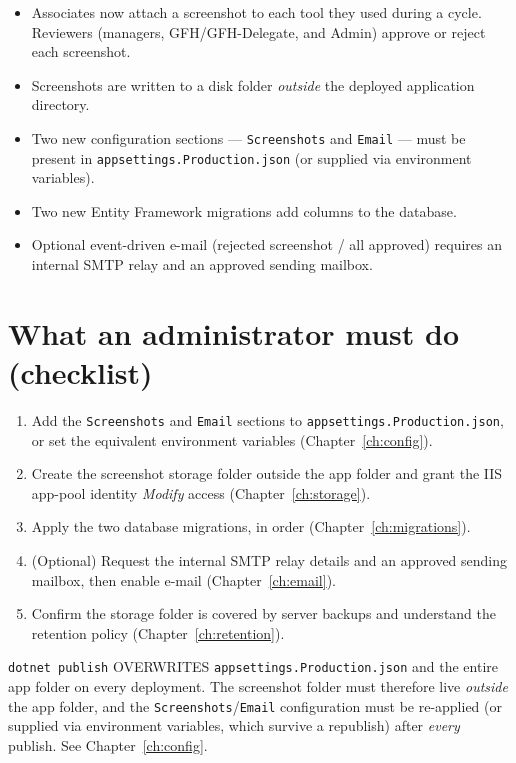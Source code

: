 \documentclass[12pt,a4paper]{report}
\begin{document}
\begin{itemize}
  \item Associates now attach a screenshot to each tool they used during a cycle. Reviewers
        (managers, GFH/GFH-Delegate, and Admin) approve or reject each screenshot.
  \item Screenshots are written to a disk folder \emph{outside} the deployed application directory.
  \item Two new configuration sections --- \texttt{Screenshots} and \texttt{Email} --- must be
        present in \texttt{appsettings.Production.json} (or supplied via environment variables).
  \item Two new Entity Framework migrations add columns to the database.
  \item Optional event-driven e-mail (rejected screenshot / all approved) requires an internal SMTP
        relay and an approved sending mailbox.
\end{itemize}

\section{What an administrator must do (checklist)}

\begin{enumerate}
  \item Add the \texttt{Screenshots} and \texttt{Email} sections to
        \texttt{appsettings.Production.json}, or set the equivalent environment variables
        (Chapter~\ref{ch:config}).
  \item Create the screenshot storage folder outside the app folder and grant the IIS app-pool
        identity \emph{Modify} access (Chapter~\ref{ch:storage}).
  \item Apply the two database migrations, in order (Chapter~\ref{ch:migrations}).
  \item (Optional) Request the internal SMTP relay details and an approved sending mailbox, then
        enable e-mail (Chapter~\ref{ch:email}).
  \item Confirm the storage folder is covered by server backups and understand the retention policy
        (Chapter~\ref{ch:retention}).
\end{enumerate}

\begin{warnbox}
\texttt{dotnet publish} OVERWRITES \texttt{appsettings.Production.json} and the entire app folder on
every deployment. The screenshot folder must therefore live \emph{outside} the app folder, and the
\texttt{Screenshots}/\texttt{Email} configuration must be re-applied (or supplied via environment
variables, which survive a republish) after \emph{every} publish. See Chapter~\ref{ch:config}.
\end{warnbox}
\end{document}
